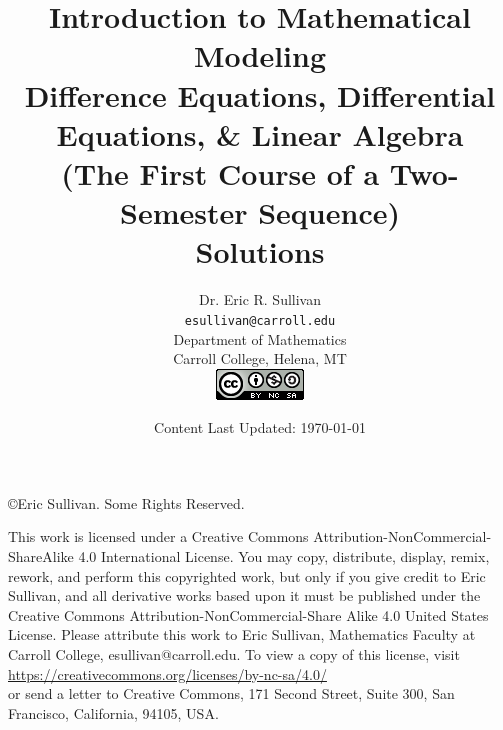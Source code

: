 \documentclass[12pt,oneside]{book}
\title{Introduction to Mathematical Modeling \\ \large Difference Equations, Differential
    Equations, \& Linear
    Algebra \\ {\small (The First Course of a Two-Semester Sequence)}
    \ifnum\ShowSoln=1 {\color{red} \\ {\bf Solutions}} \fi}
\date{Content Last Updated: \today}
\author{Dr. Eric R. Sullivan \\ \texttt{esullivan@carroll.edu}\\ Department of
Mathematics \\
Carroll College, Helena, MT \\
\includegraphics{CreativeCommons.png} \\\vspace{3in}
}
\theoremstyle{definition}
\begin{document}
\maketitle
\newpage
\noindent \copyright Eric Sullivan. Some Rights Reserved.

\vspace{0.2in}
This work is licensed under a Creative Commons Attribution-NonCommercial-ShareAlike 4.0
International License.
You may copy, distribute, display, remix, rework, and perform this copyrighted work, but only if
you give credit to Eric Sullivan, and all derivative works based upon it must be published
under the Creative Commons Attribution-NonCommercial-Share Alike 4.0 United States License. Please
attribute this work to Eric Sullivan, Mathematics Faculty at Carroll College,
esullivan@carroll.edu. To view a copy of this license, visit\\
\href{https://creativecommons.org/licenses/by-nc-sa/4.0/}{https://creativecommons.org/licenses/by-nc-sa/4.0/}\\
or send a letter to Creative Commons, 171 Second Street, Suite 300, San Francisco,
California, 94105, USA.
\tableofcontents









% 
% 
% 
% 
% 
% 
% 
% 
% 
% 
% 
% 
\begin{appendices}
    
\end{appendices}
\end{document}
